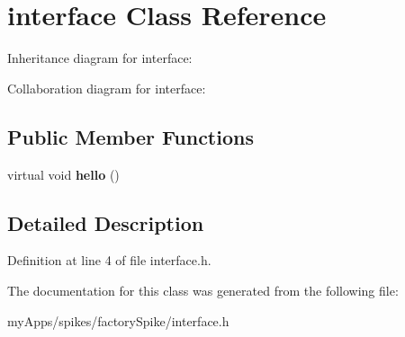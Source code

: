 \hypertarget{classinterface}{}\section{interface Class Reference}
\label{classinterface}


Inheritance diagram for interface\+:


Collaboration diagram for interface\+:
\subsection*{Public Member Functions}
\begin{DoxyCompactItemize}
\item 
\mbox{\label{classinterface_a1549ae700d750a07f192a6c05d0fe95e}} 
virtual void {\bfseries hello} ()
\end{DoxyCompactItemize}


\subsection{Detailed Description}


Definition at line 4 of file interface.\+h.



The documentation for this class was generated from the following file\+:\begin{DoxyCompactItemize}
\item 
my\+Apps/spikes/factory\+Spike/interface.\+h\end{DoxyCompactItemize}
